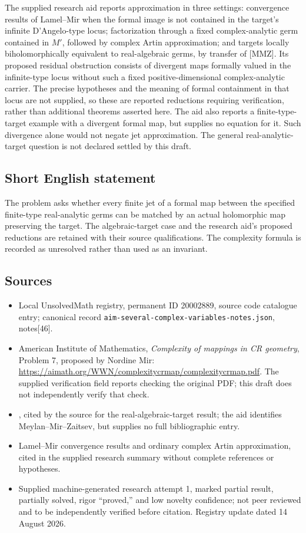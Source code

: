 \documentclass[11pt]{article}
\begin{document}
The supplied research aid reports approximation in three settings: convergence results of Lamel--Mir when the formal image is not contained in the target's infinite D'Angelo-type locus; factorization through a fixed complex-analytic germ contained in $M'$, followed by complex Artin approximation; and targets locally biholomorphically equivalent to real-algebraic germs, by transfer of [MMZ]. Its proposed residual obstruction consists of divergent maps formally valued in the infinite-type locus without such a fixed positive-dimensional complex-analytic carrier. The precise hypotheses and the meaning of formal containment in that locus are not supplied, so these are reported reductions requiring verification, rather than additional theorems asserted here. The aid also reports a finite-type-target example with a divergent formal map, but supplies no equation for it. Such divergence alone would not negate jet approximation. The general real-analytic-target question is not declared settled by this draft.
\subsection{Short English statement}
The problem asks whether every finite jet of a formal map between the specified finite-type real-analytic germs can be matched by an actual holomorphic map preserving the target. The algebraic-target case and the research aid's proposed reductions are retained with their source qualifications. The complexity formula is recorded as unresolved rather than used as an invariant.
\subsection{Sources}
\begin{itemize}
\item Local UnsolvedMath registry, permanent ID 20002889, source code catalogue entry; canonical record \texttt{aim-several-complex-variables-notes.json}, notes[46].
\item American Institute of Mathematics, \emph{Complexity of mappings in CR geometry}, Problem 7, proposed by Nordine Mir: \url{https://aimath.org/WWN/complexitycrmap/complexitycrmap.pdf}. The supplied verification field reports checking the original PDF; this draft does not independently verify that check.
\item [MMZ], cited by the source for the real-algebraic-target result; the aid identifies Meylan--Mir--Zaitsev, but supplies no full bibliographic entry.
\item Lamel--Mir convergence results and ordinary complex Artin approximation, cited in the supplied research summary without complete references or hypotheses.
\item Supplied machine-generated research attempt 1, marked partial result, partially solved, rigor ``proved,'' and low novelty confidence; not peer reviewed and to be independently verified before citation. Registry update dated 14 August 2026.
\end{itemize}
\end{document}
